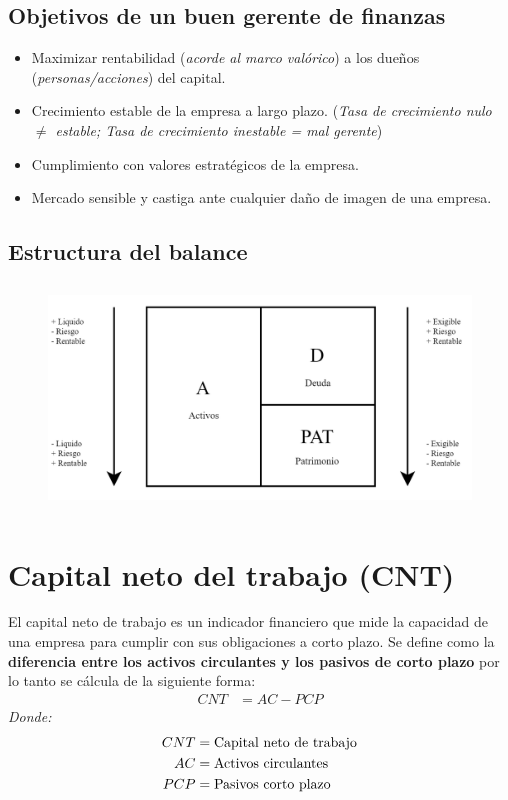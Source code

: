 \documentclass{templateNote}
\begin{document}
\subsection{Objetivos de un buen gerente de finanzas}
\begin{itemize}
    \item Maximizar rentabilidad (\textit{acorde al marco valórico}) a los dueños (\textit{personas/acciones}) del capital.
    \item Crecimiento estable de la empresa a largo plazo. (\textit{Tasa de crecimiento nulo $\neq$ estable; Tasa de crecimiento inestable = mal gerente})
    \item Cumplimiento con valores estratégicos de la empresa.
    \item Mercado sensible y castiga ante cualquier daño de imagen de una empresa.
\end{itemize}

\subsection{Estructura del balance}
\begin{figure}[H]
    \centering
    \includegraphics[height=6cm]{img/estrucBalance.png}
\end{figure}
\newpage

\section{Capital neto del trabajo (CNT)}\label{sec:Capital neto del trabajo (CNT)}
\noindent El capital neto de trabajo es un indicador financiero que mide la capacidad de una empresa para cumplir con sus obligaciones a corto plazo. Se define como la \textbf{diferencia entre los activos circulantes y los pasivos de corto plazo} por lo tanto se cálcula de la siguiente forma:
\begin{align*}
    CNT &= AC - PCP
\end{align*}
\textit{Donde:}
\begin{align*}
    CNT &= \textnormal{Capital neto de trabajo}\\
    AC &= \textnormal{Activos circulantes}\\
    PCP &= \textnormal{Pasivos corto plazo}
\end{align*}
\end{document}
